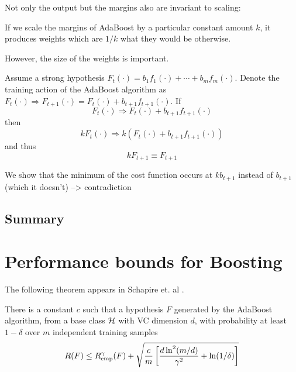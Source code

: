 Not only the output but the margins also are invariant to scaling:

\begin{theorem}
If we scale the margins of AdaBoost by a particular constant amount
$k$, it produces weights which are $1/k$ what they would be otherwise.
\end{theorem}

However, the size of the weights is important.

\begin{theorem}
Assume a strong hypothesis $F_t(\cdot) = b_1 f_1(\cdot) + \cdots + b_m
f_m(\cdot)$.  Denote the training action of the AdaBoost algorithm as
$F_t(\cdot) \Rightarrow F_{t+1}(\cdot) = F_t(\cdot) +
b_{t+1}f_{t+1}(\cdot)$.  If
\[
	F_t(\cdot) \Rightarrow F_t(\cdot) + b_{t+1}f_{t+1}(\cdot)
\]
then
\[
	kF_t(\cdot) \Rightarrow k\left( F_t(\cdot) +
	b_{t+1}f_{t+1}(\cdot) \right)
\]
and thus
\[
	kF_{t+1} \equiv F_{t+1}
\]

\proof We show that the minimum of the cost function occurs at
$kb_{t+1}$ instead of $b_{t+1}$ (which it doesn't) --> contradiction
\end{theorem}


\subsection{Summary}


\section{Performance bounds for Boosting}

The following theorem appears in Schapire et. al \cite{Schapire97}.

\begin{theorem}[Performance bound for boosting ($p$=1)]

There is a constant $c$ such that a hypothesis $F$ generated by the
AdaBoost algorithm, from a base class $\mathcal{H}$ with VC dimension $d$,
with probability at least $1 - \delta$ over $m$ independent training
samples
\begin{equation}
R(F) \leq R_{\mathrm{emp}}^{\gamma}(F) + \sqrt{\frac{c}{m} \left[ \frac{d
\ln^2 (m/d)}{\gamma^2} + \ln(1/\delta) \right] }
\end{equation}
\end{theorem}


